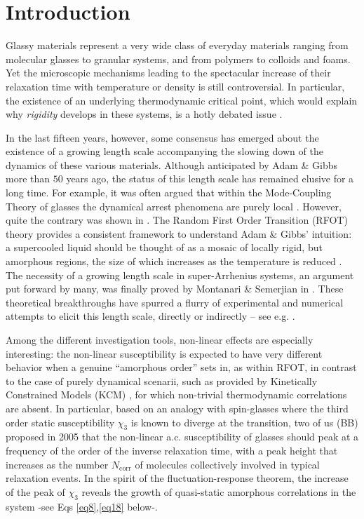 \documentclass[single column,pre]{revtex4}
\begin{document}
\maketitle



\section{\label{part1} Introduction}

Glassy materials represent a very wide class of everyday materials ranging from molecular glasses to granular systems, and from polymers to colloids and foams. Yet the microscopic mechanisms leading to the spectacular increase of their relaxation time with temperature or density is still controversial. In particular, the existence of an underlying thermodynamic critical point, which would explain why {\it rigidity} develops in these systems, is a hotly debated issue \cite{BBRMP}. 

In the last fifteen years, however, some consensus has emerged about the existence of a growing length scale accompanying the slowing down of the dynamics of these various materials. Although anticipated by Adam \& Gibbs \cite{Ada65} more than $50$ years ago, the status of this length scale has remained elusive for a long time. For example, it was often argued that within the Mode-Coupling Theory of glasses the dynamical arrest phenomena are purely local \cite{Got92}. However, quite the contrary was shown 
in \cite{BBMCT,FPMCT,IMCT}. The Random First Order Transition (RFOT) theory provides a consistent framework to understand Adam \& Gibbs' intuition: a supercooled liquid should be thought of as a mosaic of locally rigid, but amorphous regions, the size of which increases as the temperature is reduced \cite{RFOT}. The necessity of a growing length scale in super-Arrhenius systems, an argument put forward by many,  was finally proved by Montanari \& Semerjian in \cite{MS}. These theoretical breakthroughs have spurred a flurry of experimental and numerical attempts to elicit this length scale, directly or indirectly -- see e.g. \cite{bookOUP}.

Among the different investigation tools, non-linear effects are especially interesting: the non-linear susceptibility is expected to have very different behavior when a genuine ``amorphous order'' sets in, as within RFOT, in contrast to the case of purely dynamical scenarii, such as provided by Kinetically Constrained Models (KCM) \cite{kcm}, for which non-trivial thermodynamic correlations are absent. In particular, based on an analogy with spin-glasses where the third order static susceptibility $\chi_3$ is known to diverge at the transition, two of us (BB) proposed in 2005 \cite{Bou05} that the non-linear a.c. susceptibility of glasses should peak at a frequency of the order of the inverse relaxation time, with a peak height that increases as the       
number $N_{\text{corr}}$ of molecules collectively involved in typical relaxation events. In the spirit of the fluctuation-response theorem, the increase of the peak of $\chi_3$ reveals the growth of quasi-static amorphous correlations in the system -see Eqs \ref{eq8},\ref{eq18} below-. 
\end{document}
